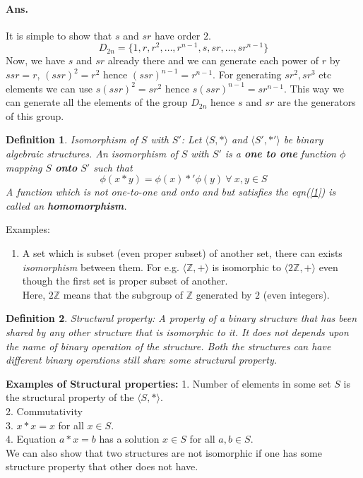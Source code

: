 \documentclass[12pt]{report}
\newtheorem{defn}{Definition}
\begin{document}
\paragraph*{Ans. } It is simple to show that $s$ and $sr$ have order $2$. 
$$ D_{2n} = \{1, r, r^2, \dots, r^{n-1}, s, sr, \dots, sr^{n-1}\}$$
Now, we have $s$ and $sr$ already there and we can generate each power of $r$ by $ssr = r$, $(ssr)^2 = r^2$ hence $(ssr)^{n-1} = r^{n-1}$. For generating $sr^2, sr^3$ etc elements we can use $s(ssr)^2 = sr^2$ hence $s(ssr)^{n-1} = sr^{n-1}$. This way we can generate all the elements of the group $D_{2n}$ hence $s$ and $sr$ are the generators of this group.
\begin{defn}
    Isomorphism of $S$ with $S'$: Let $\langle S, *\rangle$ and $\langle S', *'\rangle$ be binary algebraic structures. An isomorphism of $S$ with $S'$ is a \textbf{one to one }function $\phi$ mapping $S$ \textbf{onto} $S'$ such that
    \begin{equation} \label{1}
        \phi(x * y) = \phi(x) *' \phi(y)~\forall~ x,y \in S
    \end{equation}
    A function which is not one-to-one and onto and but satisfies the eqn(\ref{1}) is called an \textbf{homomorphism}.
\end{defn}
Examples:
\begin{enumerate}
    \item A set which is subset (even proper subset) of another set, there can exists {\em isomorphism} between them. For e.g. $\langle \mathbb{Z}, + \rangle$ is isomorphic to $\langle 2\mathbb{Z}, + \rangle$ even though the first set is proper subset of another.\\
    Here, $2\mathbb{Z}$ means that the subgroup of $\mathbb{Z}$ generated by $2$ (even integers).
\end{enumerate} 
\begin{defn}
    Structural property: A property of a binary structure that has been shared by any other structure that is isomorphic to it. It does not depends upon the name of binary operation of the structure. Both the structures can have different binary operations still share some structural property.
\end{defn}
\textbf{Examples of Structural properties: }
1. Number of elements in some set $S$ is the structural property of the $\langle S, * \rangle$.\\
2. Commutativity\\
3. $x * x = x$ for all $x \in S$.\\
4. Equation $a * x = b$ has a solution $x \in S$ for all $a,b \in S$.\\ 
We can also show that two structures are not isomorphic if one has some structure property that other does not have.
\end{document}
